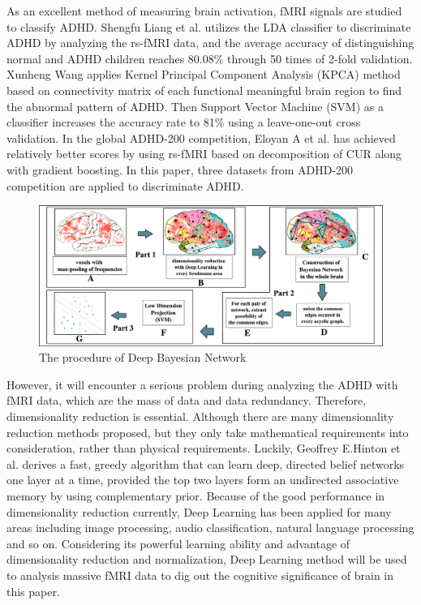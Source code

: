 \documentclass[10pt,twocolumn,letterpaper]{article}
\begin{document}
 
 
As an excellent method of measuring brain activation, fMRI
signals\cite{2} are studied to classify ADHD. Shengfu Liang et al.\cite{3} utilizes the LDA classifier to discriminate ADHD by analyzing the rs-fMRI data\cite{5}, and the average accuracy of distinguishing normal and ADHD children reaches 80.08\% through 50 times of 2-fold validation. Xunheng Wang\cite{4} applies Kernel Principal Component Analysis (KPCA) method based on connectivity matrix of each functional meaningful brain region to find the abnormal pattern of ADHD. Then Support Vector Machine (SVM) as a classifier increases the accuracy rate to 81\% using a leave-one-out cross validation. In the global ADHD-200 competition, Eloyan A et al.\cite{6} has achieved relatively better scores by using rs-fMRI based on decomposition of CUR along with gradient boosting. In this paper, three datasets from ADHD-200 competition are applied to discriminate ADHD.

\begin{figure}[ht]
\begin{center}
   \includegraphics[width=0.9\linewidth]{Figures/overviews.eps}
\end{center}
   \caption{The procedure of Deep Bayesian Network}
\label{fig:overview}
\end{figure}


However, it will encounter a serious problem during analyzing the ADHD with fMRI data, which are the mass of data and data redundancy. Therefore, dimensionality reduction is essential. Although there are many dimensionality reduction methods proposed, but they only take mathematical requirements into consideration, rather than physical requirements. Luckily, Geoffrey E.Hinton et al.\cite{8} derives a fast, greedy algorithm that can learn deep, directed belief networks one layer at a time, provided the top two layers form an undirected associative memory by using complementary prior.  Because of the good performance in dimensionality reduction currently\cite{7}, Deep Learning has been applied for many areas including image processing\cite{8}\cite{10}, audio classification\cite{9}, natural language processing\cite{12} and so on. Considering its powerful learning ability and advantage of dimensionality reduction and normalization, Deep Learning method will be used to analysis massive fMRI data to dig out the cognitive significance of brain in this paper.
\end{document}
